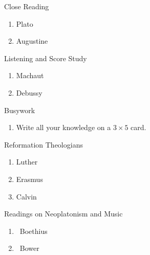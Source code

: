 \documentclass{article}
\newenvironment{Asst}[1]
	{%
		\par\medskip\noindent#1\par
		\begin{enumerate}%
	}
	{\end{enumerate}}
\newcommand{\setAsstHeader}[2]{%
	\newcommand{#1}{#2}%
}
\newcommand{\PreNote}[1]{%
	\makebox[1.5em][l]{(#1)}%
}
\newcommand{\srcI}{\PreNote{i}}
\newcommand{\srcII}{\PreNote{ii}}
\begin{document}
\setAsstHeader{\Reading}{Close Reading}
\setAsstHeader{\Music}{Listening and Score Study}

\begin{Asst}{\Reading}
\item Plato
\item Augustine
\end{Asst}

\begin{Asst}{\Music}
\item Machaut
\item Debussy
\end{Asst}

\begin{Asst}{Busywork}
\item Write all your knowledge on a $3 \times 5$ card.
\end{Asst}

\begin{Asst}{Reformation Theologians}
\item Luther
\item Erasmus
\item Calvin
\end{Asst}

\begin{Asst}{Readings on Neoplatonism and Music}
\item \srcI\ Boethius
\item \srcII\ Bower
\end{Asst}
\end{document}
